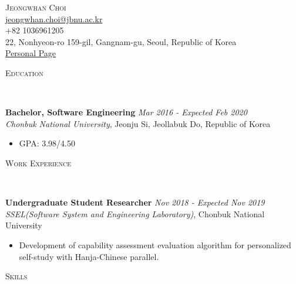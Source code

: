 \documentclass[10pt]{article}
\newenvironment{changemargin}[2]{
  \begin{list}{}{
    \setlength{\topsep}{0pt}
    \setlength{\leftmargin}{#1}
    \setlength{\rightmargin}{#2}
    \setlength{\listparindent}{\parindent}
    \setlength{\itemindent}{\parindent}
    \setlength{\parsep}{\parskip}
  }
  \item[]}{\end{list}
}
\newcommand{\lineover}{
	\begin{changemargin}{-0.05in}{-0.05in}
		\vspace*{-8pt}
		\hrulefill \\
		\vspace*{-2pt}
	\end{changemargin}
}
\newcommand{\header}[1]{
	\begin{changemargin}{-0.5in}{-0.5in}
		\scshape{#1}\\
  	\lineover
	\end{changemargin}
}
\newcommand{\contact}[5]{
	\begin{changemargin}{-0.5in}{-0.5in}
		\begin{center}
			{\Large \scshape {#1}}\\
      {#2} \\  {#3} \\ {#4} \\ {#5}
		\end{center}
	\end{changemargin}
}
\newenvironment{body} {
	\vspace*{-16pt}
	\begin{changemargin}{-0.25in}{-0.5in}
  }
	{\end{changemargin}
}
\begin{document}

\contact{Jeongwhan Choi}{\href{mailto:email@address.com}{jeongwhan.choi@jbnu.ac.kr}}{+82 1036961205}{22, Nonhyeon-ro 159-gil, Gangnam-gu, Seoul, Republic of Korea}{\href{https://jeongwhanchoi.github.io}{Personal Page}}


\header{Education}

\begin{body}
	\vspace{14pt}
	\textbf{Bachelor, Software Engineering} \hfill \emph{Mar 2016 - Expected Feb 2020} \\
	\emph{Chonbuk National University}, Jeonju Si, Jeollabuk Do, Republic of Korea \\
	\begin{itemize} \itemsep -0pt  %
	\item GPA: 3.98/4.50
	\end{itemize}

\end{body}

\medskip


\header{Work Experience}

\begin{body}
	\vspace{14pt}
	\textbf{Undergraduate Student Researcher} \hfill \emph{Nov 2018 - Expected Nov 2019} \\
	\emph{SSEL(Software System and Engineering Laboratory)}, Chonbuk National University  \\
	\begin{itemize} \itemsep -0pt  %
      \item  Development of capability assessment evaluation algorithm for personalized self-study with Hanja-Chinese parallel.
    
  	\end{itemize}


\end{body}

\medskip


\header{Skills}
\end{document}
